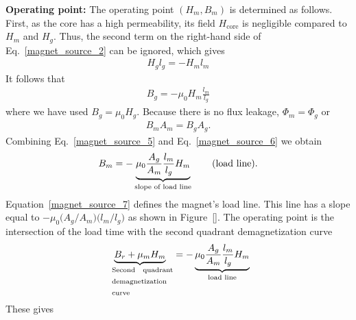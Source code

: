 \documentclass[12pt,a4paper,oneside]{book}
\begin{document}
\begin{onehalfspace}
\begin{example}
\textbf{Operating point:} The operating point $(H_m,B_m)$ is determined as follows. First, as the core has a high permeability, its field $H_\text{core}$ is negligible compared to $H_m$ and $H_g$. Thus, the second term on the right-hand side of Eq.~\eqref{magnet_source_2} can be ignored, which gives
\begin{equation}\label{magnet_source_4}
	{\begin{aligned}
		H_gl_g=-H_ml_m
	\end{aligned}}
\end{equation}
It follows that 
\begin{equation}\label{magnet_source_5}
	{\begin{aligned}
		B_g=-\mu_0H_m\frac{l_m}{l_g}
	\end{aligned}}
\end{equation}
where we have used $B_g=\mu_0H_g$. Because there is no flux leakage, $\Phi_m=\Phi_g$ or
\begin{equation}\label{magnet_source_6}
	{\begin{aligned}
		B_mA_m=B_gA_g.
	\end{aligned}}
\end{equation}
Combining Eq.~\eqref{magnet_source_5} and Eq.~\eqref{magnet_source_6} we obtain
\begin{equation}\label{magnet_source_7}
	{\begin{aligned}
			B_m=-\underbrace{\mu_0\frac{A_g}{A_m}\frac{l_m}{l_g}H_m}_\text{\normalfont slope of load line}\qquad\text{\normalfont (load line).}
	\end{aligned}}
\end{equation}
Equation~\ref{magnet_source_7} defines the magnet's load line. This line has a slope equal to $-\mu_0\big(A_g/A_m\big)\big(l_m/l_g\big)$ as shown in Figure~\ref{}. The operating point is the intersection of the load time with the second quadrant demagnetization curve
\begin{equation}\label{magnet_source_8}
	{\begin{aligned}
\underbrace{B_r+\mu_mH_m}_{\text{\normalfont\ \begin{centering} \parbox{8em}{Second quadrant demagnetization curve}\end{centering}}} = -\underbrace{\mu_0\frac{A_g}{A_m}\frac{l_m}{l_g}H_m}_{\text{\normalfont load line}}
	\end{aligned}}
\end{equation}
These gives 
\begin{equation}\label{magnet_source_9}
	{\begin{aligned}

\end{aligned}}
\end{equation}
\end{example}
\end{onehalfspace}
\end{document}
